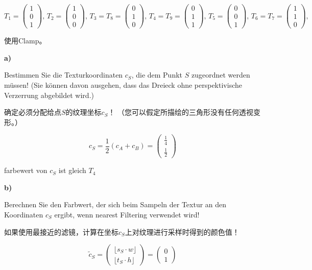 \documentclass[fleqn]{article}
\begin{document}
$T_1=\begin{pmatrix}
    1\\0\\1
\end{pmatrix},\,
T_2=\begin{pmatrix}
    1\\0\\0
\end{pmatrix},\,
T_3=T_8=\begin{pmatrix}
    0\\1\\0
\end{pmatrix},\,
T_4=T_9=\begin{pmatrix}
    0\\1\\1
\end{pmatrix},\,
T_5=\begin{pmatrix}
    0\\0\\1
\end{pmatrix},\,
T_6=T_7=\begin{pmatrix}
    1\\1\\0
\end{pmatrix},\,$

使用Clamp。

\noindent\textbf{a)}

Bestimmen Sie die Texturkoordinaten $c_S$, die dem Punkt $S$ zugeordnet werden müssen! (Sie können davon ausgehen, dass das Dreieck ohne perspektivische Verzerrung abgebildet wird.)

确定必须分配给点$ S $的纹理坐标$ c_S $！ （您可以假定所描绘的三角形没有任何透视变形。）

$$c_S=\frac{1}{2}(c_A+c_B)=\begin{pmatrix}
    \frac{1}{4}\\\frac{1}{2}
\end{pmatrix}$$

farbewert von $c_S$ ist gleich $T_4$

\noindent\textbf{b)}

Berechnen Sie den Farbwert, der sich beim Sampeln der Textur an den Koordinaten $c_S$ ergibt, wenn nearest Filtering verwendet wird!

如果使用最接近的滤镜，计算在坐标$ c_S $上对纹理进行采样时得到的颜色值！

$$\tilde{c}_S=\begin{pmatrix}
    \lfloor s_S\cdot w \rfloor\\
    \lfloor t_S\cdot h \rfloor
\end{pmatrix}=\begin{pmatrix}
    0\\1
\end{pmatrix}$$
\end{document}

